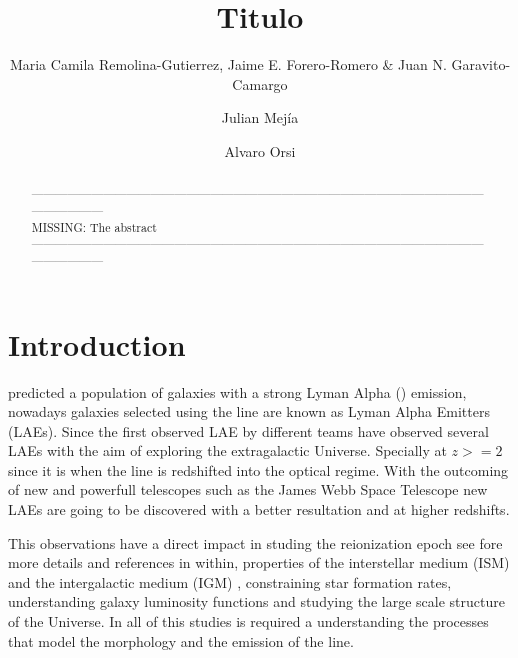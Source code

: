 \documentclass{latex/emulateapj}
\begin{document}
\title{Titulo}


\author{Maria Camila Remolina-Gutierrez, Jaime E. Forero-Romero \&
  Juan N. Garavito-Camargo} 
\author{Julian Mej\'ia}
\author{Alvaro Orsi}


\begin{abstract}
\noindent ------------------------------------------------------------------------------------------------------------------------------------\\
MISSING: The abstract\\
------------------------------------------------------------------------------------------------------------------------------------\\
\end{abstract}

\section{Introduction}
\label{sec:intro}

\cite{PartridgePeebles} predicted a population of galaxies with a strong 
Lyman Alpha (\lya) emission,  nowadays galaxies selected using the \lya 
line are known as Lyman Alpha Emitters (LAEs). Since the first 
observed LAE by \cite{DjorgovskiThompson} different teams have 
observed several LAEs \cite{Kulas12, Yamada2012,
  Chonis2013,Finkelstein2013,Ostlin14} with the aim of exploring the
extragalactic Universe.  Specially at $z>=2$ since it is when
the  line is redshifted into the optical regime. With the outcoming of
new and powerfull telescopes such as the James Webb Space Telescope
new LAEs are going to be discovered with a better resultation and at
higher redshifts. 
  
This observations have a direct impact in studing the reionization epoch
see \cite{review} fore more details and references in within,
properties of the interstellar medium (ISM) and the intergalactic medium (IGM)
\citep{Behrens13} \citep{DijkstraKramer}, constraining star formation 
rates, understanding galaxy luminosity functions \cite{Max} and
studying the large scale structure of the Universe. In all of this
studies is required a understanding the processes 
that model the morphology and the emission of the \lya line. 
\end{document}
